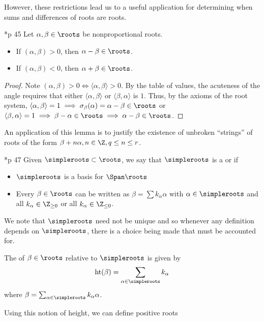 \documentclass[11pt,leqno,oneside]{amsart}
\numberwithin{thm}{section}
\begin{document}
However, these restrictions lead us to a useful
application for determining when sums and differences of roots are
roots.
\begin{lem}
  \cite{humph}*{p 45} Let $\alpha,\beta \in \roots$ be nonproportional
  roots.
  \begin{itemize}
  \item If $(\alpha,\beta) > 0$, then $\alpha-\beta \in \roots$.
  \item If $(\alpha,\beta) < 0$, then $\alpha+\beta \in \roots$.
  \end{itemize}
\end{lem}
\begin{proof}
  Note \((\alpha,\beta) > 0 \iff \langle \alpha,\beta \rangle >
  0\). By the table of values, the acuteness of the angle requires
  that either \(\langle \alpha,\beta \rangle\) or \(\langle
  \beta,\alpha \rangle\) is \(1\). Thus, by the axioms of the root
  system, \(\langle \alpha,\beta \rangle = 1 \implies
  \sigma_\beta(\alpha) = \alpha-\beta \in \roots\) or \(\langle
  \beta,\alpha \rangle = 1 \implies \beta-\alpha \in \roots \implies
  \alpha-\beta \in \roots\).
\end{proof}
An application of this lemma is to justify the existence of
unbroken ``strings'' of roots of the form $\beta + n \alpha, n \in \Z,
q \leq n \leq r$. 
\begin{defn}
  \cite{humph}*{p 47} Given $\simpleroots \subset \roots$, we say that $\simpleroots$ is a  or  if
  \begin{itemize}
  \item $\simpleroots$ is a basis for $\Span \roots$
  \item Every $\beta \in \roots$ can be written as $\beta = \sum
    k_\alpha \alpha$ with $\alpha \in \simpleroots$ and all $k_\alpha \in
    \Z_{\geq 0}$ or all $k_\alpha \in \Z_{\leq 0}$.
  \end{itemize}
\end{defn}
We note that $\simpleroots$ need not be unique and so whenever any
definition depends on $\simpleroots$, there is a choice being made that must
be accounted for.
\begin{defn}
  The  of $\beta \in \roots$ relative to $\simpleroots$ is given
  by \[
    \operatorname{ht}(\beta) = \sum_{\alpha \in \simpleroots} k_\alpha
  \]
  where $\beta = \sum_{\alpha \in \simpleroots} k_\alpha \alpha$. 
\end{defn}
Using this notion of height, we can define positive roots
\end{document}
